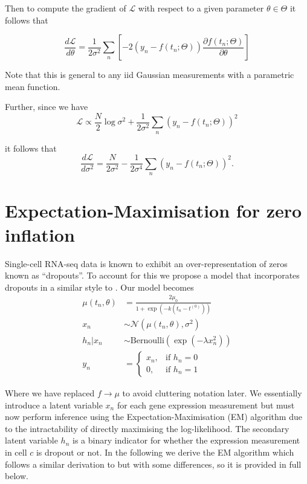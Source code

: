 Then to compute the gradient of $\mathcal{L}$ with respect to a given parameter $\theta \in \Theta$ it follows that


\begin{equation}
\frac{d\mathcal{L}}{d \theta} = \frac{1}{2 \sigma^2} \sum_n
\left[ -2 \left( y_n - f(t_n; \Theta) \right) \frac{\partial f(t_n; \Theta)}{\partial \theta} \right]
\end{equation}


Note that this is general to any iid Gaussian measurements with a parametric mean function.

Further, since we have
\begin{equation}
\mathcal{L} \propto \frac{N}{2} \log \sigma^2 + \frac{1}{2 \sigma^2}
\sum_n \left( y_n - f(t_n; \Theta) \right)^2
\end{equation}

it follows that
\begin{equation}
\frac{d\mathcal{L}}{d \sigma^2} = \frac{N}{2 \sigma^2} - \frac{1}{2 \sigma^4} \sum_n \left( y_n - f(t_n; \Theta) \right)^2.
\end{equation}

\section{Expectation-Maximisation for zero inflation} \label{app:switchdeem}

Single-cell RNA-seq data is known to exhibit an over-representation of zeros known as ``dropouts''. To account for this we propose a model that incorporates dropouts in a similar style to \cite{pierson2015zifa}. Our model becomes
\begin{equation}
\begin{aligned}
\mu(t_n, \theta) & = \frac{2 \mu_0}{1 + \exp\left(-k(t_n - t^{(0)})\right)} \\
x_{n} & \sim \mathcal{N}(\mu(t_n, \theta), \sigma^2) \\
h_{n} | x_{n} & \sim \mathrm{Bernoulli}(\exp(-\lambda x_{n}^2)) \\
    y_{n} &=
\begin{cases}
    x_{n} ,& \text{if } h_{n} = 0\\
    0,  & \text{if } h_{n} = 1
\end{cases}
\end{aligned}
\end{equation}

Where we have replaced $f \rightarrow \mu$ to avoid cluttering notation later. We essentially introduce a latent variable $x_n$ for each gene expression measurement but must now perform inference using the Expectation-Maximisation (EM) algorithm due to the intractability of directly maximising the log-likelihood. The secondary latent variable $h_n$ is a binary indicator for whether the expression measurement in cell $c$ is dropout or not. In the following we derive the EM algorithm which follows a similar derivation to \cite{pierson2015zifa} but with some differences, so it is provided in full below.

